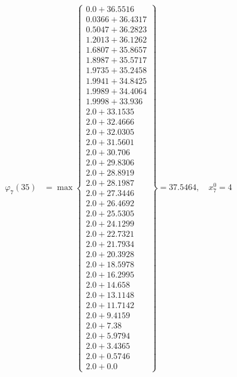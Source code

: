 \documentclass{article}
\begin{document}
\begin{align*}
  
\varphi_{7}(35) &= \max \left\{ \begin{array}{c}
0.0 + 36.5516 \\
 0.0366 + 36.4317 \\
 0.5047 + 36.2823 \\
 1.2013 + 36.1262 \\
 1.6807 + 35.8657 \\
 1.8987 + 35.5717 \\
 1.9735 + 35.2458 \\
 1.9941 + 34.8425 \\
 1.9989 + 34.4064 \\
 1.9998 + 33.936 \\
 2.0 + 33.1535 \\
 2.0 + 32.4666 \\
 2.0 + 32.0305 \\
 2.0 + 31.5601 \\
 2.0 + 30.706 \\
 2.0 + 29.8306 \\
 2.0 + 28.8919 \\
 2.0 + 28.1987 \\
 2.0 + 27.3446 \\
 2.0 + 26.4692 \\
 2.0 + 25.5305 \\
 2.0 + 24.1299 \\
 2.0 + 22.7321 \\
 2.0 + 21.7934 \\
 2.0 + 20.3928 \\
 2.0 + 18.5978 \\
 2.0 + 16.2995 \\
 2.0 + 14.658 \\
 2.0 + 13.1148 \\
 2.0 + 11.7142 \\
 2.0 + 9.4159 \\
 2.0 + 7.38 \\
 2.0 + 5.9794 \\
 2.0 + 3.4365 \\
 2.0 + 0.5746 \\
 2.0 + 0.0
\end{array} \right\}=37.5464,\quad x_{7}^0=4\\
  
  
  

\end{align*}
\end{document}
